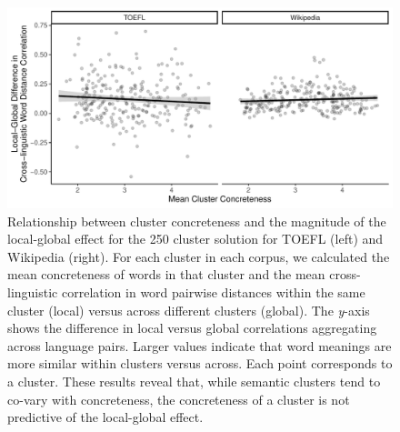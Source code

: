 \documentclass[9pt,twoside,lineno]{pnas-new}
\begin{document}
\begin{figure}[h]
\centering
     \includegraphics[width = 6.3in]{suppfigs/local_global_concreteness_semantics_plot.pdf}
         \caption{Relationship between cluster concreteness and the magnitude of the local-global effect for the 250 cluster solution for TOEFL (left) and Wikipedia (right). For each cluster in each corpus, we calculated the mean concreteness of words in that cluster and the mean cross-linguistic correlation in word pairwise distances within the same cluster (local) versus across different clusters (global). The {\it y}-axis shows the difference in local versus global correlations  aggregating across language pairs. Larger values indicate that word meanings are more similar within clusters versus across. Each point corresponds to a cluster. These results reveal that, while semantic clusters tend to co-vary with concreteness, the concreteness of a cluster is not predictive of the local-global effect. }
\end{figure}

\pagebreak
 \clearpage
 
 
\end{document}
